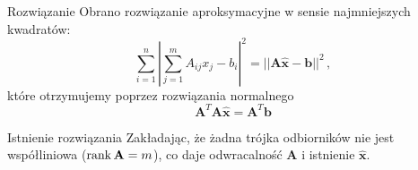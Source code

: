 \begin{frame}
    \begin{block}{Rozwiązanie}
        Obrano rozwiązanie aproksymacyjne w sensie najmniejszych kwadratów:
        \begin{equation*}
            \sum_{i=1}^{n}{\left|\sum_{j=1}^{m}{A_{ij}x_j} - b_i\right|^2} = ||\mathbf{A}\hat{\mathbf{x}} - \mathbf{b}||^2\,,
        \end{equation*}
        które otrzymujemy poprzez rozwiązania normalnego
        \begin{equation*}
            \mathbf{A}^T\mathbf{A}\hat{\mathbf{x}} = \mathbf{A}^T\mathbf{b}
        \end{equation*}
    \end{block}

    \begin{block}{Istnienie rozwiązania}
        Zakładając, że żadna trójka odbiorników nie jest współliniowa ($\operatorname{rank}\mathbf{A} = m$), co daje odwracalność $\mathbf{A}$ i istnienie $\hat{\mathbf{x}}$.
    \end{block}
\end{frame}